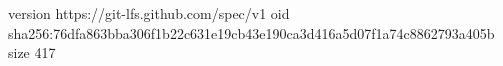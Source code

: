 version https://git-lfs.github.com/spec/v1
oid sha256:76dfa863bba306f1b22c631e19cb43e190ca3d416a5d07f1a74c8862793a405b
size 417
